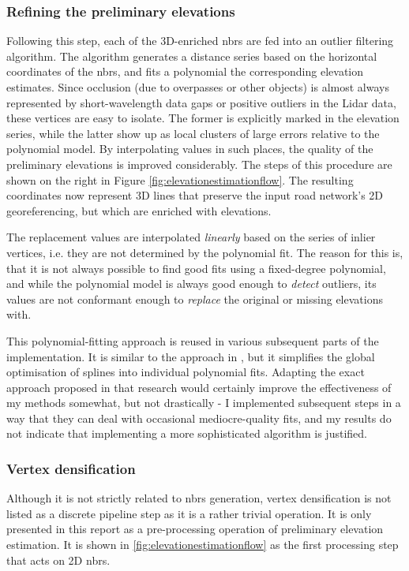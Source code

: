 \subsubsection{Refining the preliminary elevations}

Following this step, each of the 3D-enriched \ac{nbrs} are fed into an outlier filtering algorithm. The algorithm generates a distance series based on the horizontal coordinates of the \ac{nbrs}, and fits a polynomial the corresponding elevation estimates. Since occlusion (due to overpasses or other objects) is almost always represented by short-wavelength data gaps or positive outliers in the Lidar data, these vertices are easy to isolate. The former is explicitly marked in the elevation series, while the latter show up as local clusters of large errors relative to the polynomial model. By interpolating values in such places, the quality of the preliminary elevations is improved considerably. The steps of this procedure are shown on the right in Figure \ref{fig:elevationestimationflow}. The resulting coordinates now represent 3D lines that preserve the input road network's 2D georeferencing, but which are enriched with elevations.

The replacement values are interpolated \textit{linearly} based on the series of inlier vertices, i.e. they are not determined by the polynomial fit. The reason for this is, that it is not always possible to find good fits using a fixed-degree polynomial, and while the polynomial model is always good enough to \textit{detect} outliers, its values are not conformant enough to \textit{replace} the original or missing elevations with.

This polynomial-fitting approach is reused in various subsequent parts of the implementation. It is similar to the approach in \cite{boyko_funkhauser_2011}, but it simplifies the global optimisation of splines into individual polynomial fits. Adapting the exact approach proposed in that research would certainly improve the effectiveness of my methods somewhat, but not drastically - I implemented subsequent steps in a way that they can deal with occasional mediocre-quality fits, and my results do not indicate that implementing a more sophisticated algorithm is justified.

\subsubsection{Vertex densification}

Although it is not strictly related to \ac{nbrs} generation, vertex densification is not listed as a discrete pipeline step as it is a rather trivial operation. It is only presented in this report as a pre-processing operation of preliminary elevation estimation. It is shown in \ref{fig:elevationestimationflow} as the first processing step that acts on 2D \ac{nbrs}.

